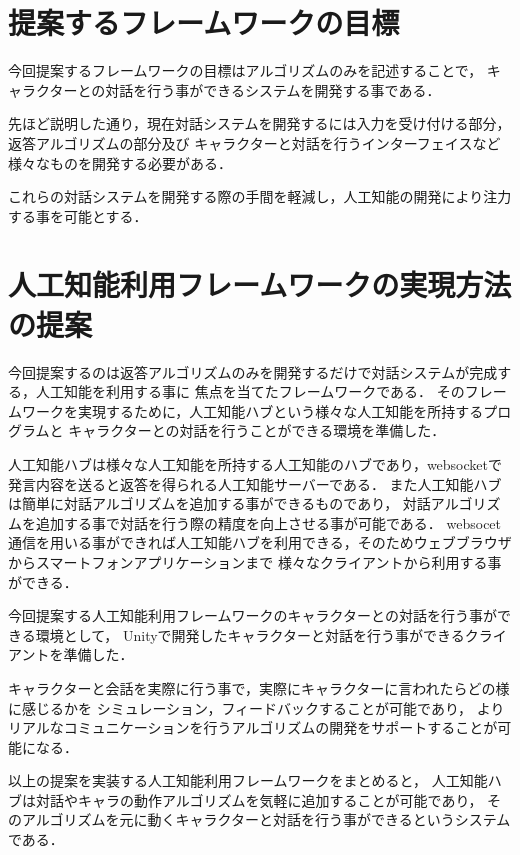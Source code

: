 \section{提案するフレームワークの目標}
今回提案するフレームワークの目標はアルゴリズムのみを記述することで，
キャラクターとの対話を行う事ができるシステムを開発する事である．

先ほど説明した通り，現在対話システムを開発するには入力を受け付ける部分，返答アルゴリズムの部分及び
キャラクターと対話を行うインターフェイスなど様々なものを開発する必要がある．

これらの対話システムを開発する際の手間を軽減し，人工知能の開発により注力する事を可能とする．

\section{人工知能利用フレームワークの実現方法の提案}
今回提案するのは返答アルゴリズムのみを開発するだけで対話システムが完成する，人工知能を利用する事に
焦点を当てたフレームワークである．
そのフレームワークを実現するために，人工知能ハブという様々な人工知能を所持するプログラムと
キャラクターとの対話を行うことができる環境を準備した．

人工知能ハブは様々な人工知能を所持する人工知能のハブであり，websocketで発言内容を送ると返答を得られる人工知能サーバーである．
また人工知能ハブは簡単に対話アルゴリズムを追加する事ができるものであり，
対話アルゴリズムを追加する事で対話を行う際の精度を向上させる事が可能である．
websocet通信を用いる事ができれば人工知能ハブを利用できる，そのためウェブブラウザからスマートフォンアプリケーションまで
様々なクライアントから利用する事ができる．

今回提案する人工知能利用フレームワークのキャラクターとの対話を行う事ができる環境として，
Unityで開発したキャラクターと対話を行う事ができるクライアントを準備した．

キャラクターと会話を実際に行う事で，実際にキャラクターに言われたらどの様に感じるかを
シミュレーション，フィードバックすることが可能であり，
よりリアルなコミュニケーションを行うアルゴリズムの開発をサポートすることが可能になる．

以上の提案を実装する人工知能利用フレームワークをまとめると，
人工知能ハブは対話やキャラの動作アルゴリズムを気軽に追加することが可能であり，
そのアルゴリズムを元に動くキャラクターと対話を行う事ができるというシステムである．
